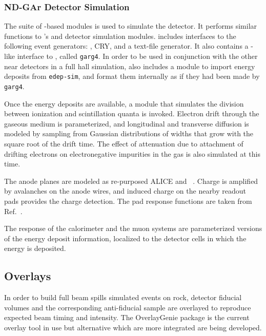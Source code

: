 \documentclass[../main-v1.tex]{subfiles}
\begin{document}
\subsubsection{ND-GAr Detector Simulation}
\label{sec:usecases_ndgardetsim}

The  suite of -based modules is used to simulate the  detector.  It performs similar functions to 's  and detector simulation modules.   includes interfaces to the following event generators:  , CRY, and a text-file generator.  It also contains a -like interface to , called {\tt garg4}.  In order to be used in conjunction with the other near detectors in a full hall simulation,  also includes a module to import energy deposits from {\tt edep-sim}, and format them internally as if they had been made by {\tt garg4}.

Once the energy deposits are available, a module that simulates the division between ionization and scintillation quanta is invoked.  Electron drift through the gaseous medium is parameterized, and longitudinal and transverse diffusion is modeled by sampling from Gaussian distributions of widths that grow with the square root of the drift time.  The effect of attenuation due to attachment of drifting electrons on electronegative impurities in the gas is also simulated at this time. 

The anode planes are modeled as re-purposed ALICE %
 and  ~\cite{Dellacasa:2000bm}.  Charge is amplified by avalanches on the anode wires, and induced charge on the nearby readout pads provides the charge detection.  The pad response functions are taken from Ref.~\cite{Dellacasa:2000bm}.

The response of the calorimeter and the muon systems are parameterized versions of the energy deposit information, localized to the detector cells in which the energy is deposited.

\subsection{Overlays}
In order to build full beam spills simulated events on rock, detector fiducial volumes and the corresponding anti-fiducial sample are overlayed to reproduce expected beam timing and intensity. The OverlayGenie package is the current overlay tool in use but alternative which are more integrated are being developed. 
\end{document}
